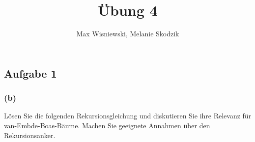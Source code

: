 \documentclass[11pt,a4paper,ngerman]{article}
\date{}
\title{Übung 4}
\author{Max Wisniewski, Melanie Skodzik}
\begin{document}

\renewcommand{\figurename}{Grafik}

\maketitle
\thispagestyle{fancy}


\subsection*{Aufgabe 1}



\subsubsection*{(b)}

Lösen Sie die folgenden Rekursionsgleichung und diskutieren Sie ihre Relevanz für van-Embde-Boas-Bäume. Machen Sie geeignete Annahmen über den Rekursionsanker.
\end{document}
